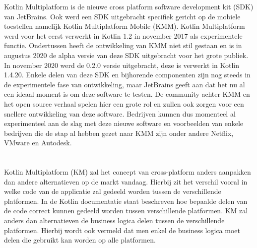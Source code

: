 Kotlin Multiplatform is de nieuwe cross platform software development kit (SDK) van JetBrains. Ook werd een SDK uitgebracht specifiek gericht op de mobiele toestellen namelijk Kotlin Multiplatform Mobile (KMM). Kotlin Multiplatform werd voor het eerst verwerkt in Kotlin 1.2 in november 2017 als experimentele functie.\autocite{Jemerov2017} 
Ondertussen heeft de ontwikkeling van KMM niet stil gestaan en is in augustus 2020 de alpha versie van deze SDK uitgebracht voor het grote publiek.\autocite{Petrova2020} In november 2020 werd de 0.2.0 versie uitgebracht, deze is verwerkt in Kotlin 1.4.20.\autocite{JetBrains2020} Enkele delen van deze SDK en bijhorende componenten zijn nog steeds in de experimentele fase van ontwikkeling, maar JetBrains geeft aan dat het nu al een ideaal moment is om deze software te testen.\autocite{Petrova2020} De community achter KMM en het open source verhaal spelen hier een grote rol en zullen ook zorgen voor een snellere ontwikkeling van deze software. Bedrijven kunnen dus momenteel al experimenteel aan de slag met deze nieuwe software en voorbeelden van enkele bedrijven die de stap al hebben gezet naar KMM zijn onder andere Netflix, VMware en Autodesk.\autocite{KotlinKMMCaseStudies}

\subsection{}
\label{sec:SVZKM}

\subsection{}
\label{sec:SVZKMM}

\section{}
\label{sec:SVZKMMvsandere}
Kotlin Multiplatform (KM) zal het concept van cross-platform anders aanpakken dan andere alternatieven op de markt vandaag. Hierbij zit het verschil vooral in welke code van de applicatie zal gedeeld worden tussen de verschillende platformen. In de Kotlin documentatie staat beschreven hoe bepaalde delen van de code correct kunnen gedeeld worden tussen verschillende platformen. KM zal anders dan alternatieven de business logica delen tussen de verschillende platformen.\autocite{Kotlin2021} Hierbij wordt ook vermeld dat men enkel de business logica moet delen die gebruikt kan worden op alle platformen. 

